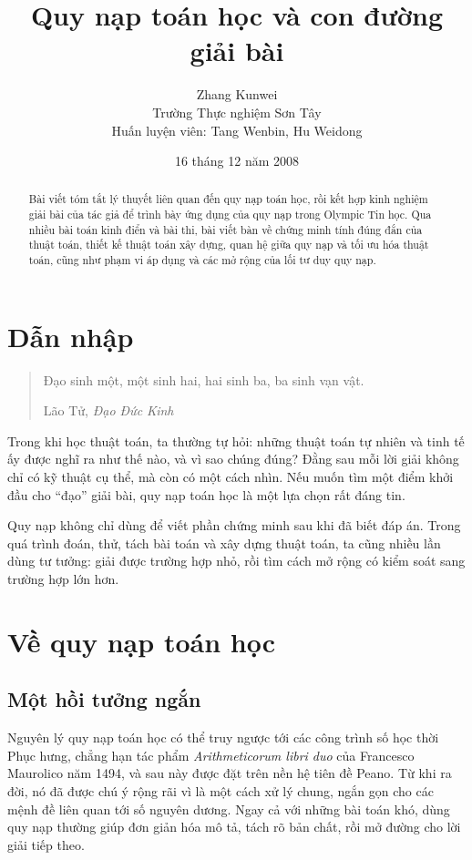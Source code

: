 \documentclass[11pt]{article}
\title{Quy nạp toán học và con đường giải bài}
\author{Zhang Kunwei\\Trường Thực nghiệm Sơn Tây\\Huấn luyện viên: Tang Wenbin, Hu Weidong}
\date{16 tháng 12 năm 2008}
\begin{document}
\maketitle


\begin{abstract}
Bài viết tóm tắt lý thuyết liên quan đến quy nạp toán học, rồi kết hợp kinh
nghiệm giải bài của tác giả để trình bày ứng dụng của quy nạp trong Olympic
Tin học. Qua nhiều bài toán kinh điển và bài thi, bài viết bàn về chứng minh
tính đúng đắn của thuật toán, thiết kế thuật toán xây dựng, quan hệ giữa quy
nạp và tối ưu hóa thuật toán, cũng như phạm vi áp dụng và các mở rộng của lối
tư duy quy nạp.
\end{abstract}

\tableofcontents

\section{Dẫn nhập}

\begin{quote}
Đạo sinh một, một sinh hai, hai sinh ba, ba sinh vạn vật.

\hfill Lão Tử, \textit{Đạo Đức Kinh}
\end{quote}

Trong khi học thuật toán, ta thường tự hỏi: những thuật toán tự nhiên và tinh
tế ấy được nghĩ ra như thế nào, và vì sao chúng đúng? Đằng sau mỗi lời giải
không chỉ có kỹ thuật cụ thể, mà còn có một cách nhìn. Nếu muốn tìm một điểm
khởi đầu cho ``đạo'' giải bài, quy nạp toán học là một lựa chọn rất đáng tin.

Quy nạp không chỉ dùng để viết phần chứng minh sau khi đã biết đáp án. Trong
quá trình đoán, thử, tách bài toán và xây dựng thuật toán, ta cũng nhiều lần
dùng tư tưởng: giải được trường hợp nhỏ, rồi tìm cách mở rộng có kiểm soát
sang trường hợp lớn hơn.

\section{Về quy nạp toán học}

\subsection{Một hồi tưởng ngắn}

Nguyên lý quy nạp toán học có thể truy ngược tới các công trình số học thời
Phục hưng, chẳng hạn tác phẩm \textit{Arithmeticorum libri duo} của Francesco
Maurolico năm 1494, và sau này được đặt trên nền hệ tiên đề Peano. Từ khi ra
đời, nó đã được chú ý rộng rãi vì là một cách xử lý chung, ngắn gọn cho các
mệnh đề liên quan tới số nguyên dương. Ngay cả với những bài toán khó, dùng
quy nạp thường giúp đơn giản hóa mô tả, tách rõ bản chất, rồi mở đường cho
lời giải tiếp theo.
\end{document}
